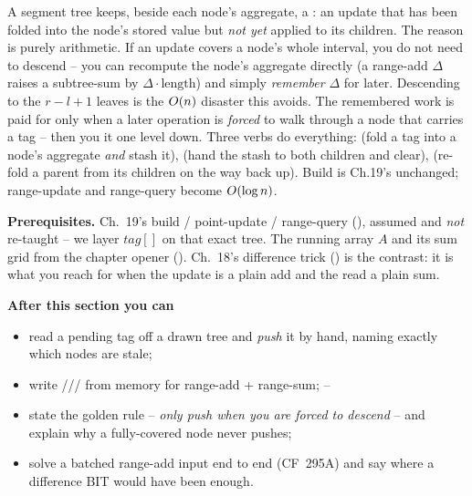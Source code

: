 \begin{topicintro}
A  segment tree keeps, beside each node's aggregate, a : an update that has been folded into the node's stored value but \emph{not yet} applied to its children.  The reason is purely arithmetic.  If an update covers a node's whole interval, you do not need to descend -- you can recompute the node's aggregate directly (a range-add \(\Delta\) raises a subtree-sum by \(\Delta\cdot\text{length}\)) and simply \emph{remember} \(\Delta\) for later.  Descending to the \(r-l+1\) leaves is the \(O(n)\) disaster this avoids.  The remembered work is paid for only when a later operation is \emph{forced} to walk through a node that carries a tag -- then you  it one level down.  Three verbs do everything:  (fold a tag into a node's aggregate \emph{and} stash it),  (hand the stash to both children and clear),  (re-fold a parent from its children on the way back up).  Build is Ch.19's unchanged; range-update and range-query become \(O(\log n)\).

\textbf{Prerequisites.} Ch.~19's build / point-update / range-query (), assumed and \emph{not} re-taught -- we layer \(\mathit{tag}[]\) on that exact tree.  The running array \(A\) and its sum grid from the chapter opener ().  Ch.~18's difference trick () is the contrast: it is what you reach for when the update is a plain add and the read a plain sum.

\textbf{After this section you can}
\begin{itemize}[nosep]
  \item read a pending tag off a drawn tree and \emph{push} it by hand, naming exactly which nodes are stale; \hfill{}
  \item write /// from memory for range-add + range-sum; \hfill{}--
  \item state the golden rule -- \emph{only push when you are forced to descend} -- and explain why a fully-covered node never pushes; \hfill{}
  \item solve a batched range-add input end to end (CF~295A) and say where a difference BIT would have been enough. \hfill{}
\end{itemize}
\end{topicintro}

